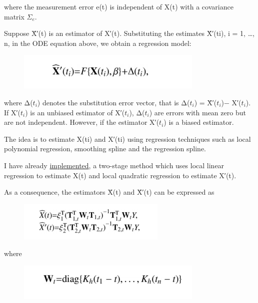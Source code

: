 \documentclass[11pt]{article}
\makeatletter
\def\maxwidth{\ifdim\Gin@nat@width>\linewidth\linewidth
    \else\Gin@nat@width\fi}
\let\Oldincludegraphics\includegraphics
\renewcommand{\includegraphics}[1]{\Oldincludegraphics[width=.8\maxwidth]{#1}}
\makeatother
\begin{document}
where the measurement error e(t) is independent of X(t) with a
covariance matrix \(Σ_{e}\).

Suppose X̂′(t) is an estimator of X′(t). Substituting the estimates
X̂′(ti), i = 1, \ldots{}, n, in the ODE equation above, we obtain a
regression model:

\begin{figure}[htbp]
\centering
\includegraphics{images/2_stage_form_reg.png}
\caption{}
\end{figure}

where Δ(\(t_{i}\)) denotes the substitution error vector, that is
Δ(\(t_{i}\)) = X̂′(\(t_{i}\))− X′(\(t_{i}\)). If X′(\(t_{i}\)) is an
unbiased estimator of X′(\(t_{i}\)), Δ(\(t_{i}\)) are errors with mean
zero but are not independent. However, if the estimator X′(\(t_{i}\)) is
a biased estimator.

The idea is to estimate X(ti) and X′(ti) using regression techniques
such as local polynomial regression, smoothing spline and the regression
spline.

I have already
\href{https://github.com/JuliaDiffEq/DiffEqParamEstim.jl/pull/6}{implemented},
a two-stage method which uses local linear regression to estimate X(t)
and local quadratic regression to estimate X′(t).

As a consequence, the estimators X̂(t) and X̂′(t) can be expressed as

\begin{figure}[htbp]
\centering
\includegraphics{images/Parameter_Estimation.png}
\caption{}
\end{figure}

where

\begin{figure}[htbp]
\centering
\includegraphics{images/2_stage_form_reg_W.png}
\caption{}
\end{figure}
\end{document}
